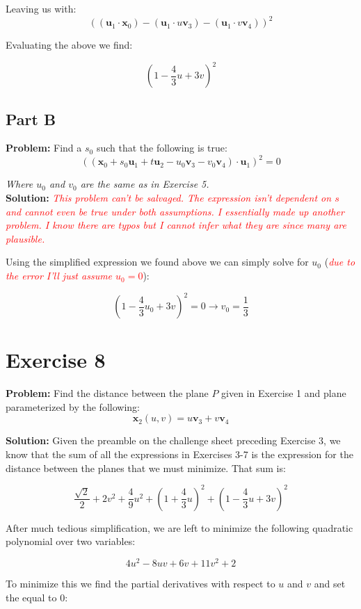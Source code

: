 \documentclass{article}
\begin{document}
Leaving us with:
$$((\mathbf u_1\cdot\mathbf x_0)-(\mathbf u_1\cdot u\mathbf v_3)-(\mathbf u_1\cdot v\mathbf v_4))^2$$

Evaluating the above we find:

$$\left(1-\frac{4}{3}u+3v\right)^2$$

\subsection*{Part B}
\textbf{Problem:} Find a $s_0$ such that the following is true:
$$((\mathbf x_0+s_0\mathbf u_1+t\mathbf u_2-u_0\mathbf v_3-v_0\mathbf v_4)\cdot\mathbf u_1)^2=0$$

\textit{Where $u_0$ and $v_0$ are the same as in Exercise 5.}
\\
\textbf{Solution:} \textit{\textcolor{red}{This problem can't be salvaged. The expression isn't dependent on $s$ and cannot even be true under both assumptions. I essentially made up another problem. I know there are typos but I cannot infer what they are since many are plausible.}}

Using the simplified expression we found above we can simply solve for $u_0$ (\textit{\textcolor{red}{due to the error I'll just assume $u_0=0$}}):

$$\left(1-\frac{4}{3}u_0+3v\right)^2=0\rightarrow \boxed{v_0=\frac{1}{3}}$$

\section*{Exercise 8}
\textbf{Problem:} Find the distance between the plane $P$ given in Exercise 1 and plane parameterized by the following:
$$\mathbf x_2(u,v)=u\mathbf v_3+v\mathbf v_4$$

\textbf{Solution:} Given the preamble on the challenge sheet preceding Exercise 3, we know that the sum of all the expressions in Exercises 3-7 is the expression for the distance between the planes that we must minimize. That sum is:

$$\frac{\sqrt 2}{2}+2v^2+\frac{4}{9}u^2+\left(1+\frac{4}{3}u\right)^2+\left(1-\frac{4}{3}u+3v\right)^2$$

After much tedious simplification, we are left to minimize the following quadratic polynomial over two variables:

$$4u^2-8uv+6v+11v^2+2$$

To minimize this we find the partial derivatives with respect to $u$ and $v$ and set the equal to 0:
\end{document}
